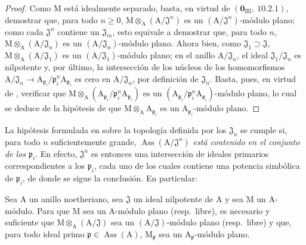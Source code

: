 \begin{proof}
Como $\mathrm{M}$ está idealmente separado, basta, en virtud de $(\mathbf{0}_{\mathrm{III}},~10.2.1)$, demostrar
que, para todo $n\geq 0$, $\mathrm{M}\otimes_\mathrm{A}(\mathrm{A}/\mathfrak{J}^n)$ es un $(\mathrm{A}/\mathfrak{J}^n)$-módulo plano; como cada $\mathfrak{J}^n$ contiene
un $\mathfrak{J}_m$, esto equivale a demostrar que, para todo $n$, $\mathrm{M}\otimes_\mathrm{A}(\mathrm{A}/\mathfrak{J}_n)$ es un $(\mathrm{A}/\mathfrak{J}_n)$-módulo
plano. Ahora bien, como $\mathfrak{J}_1\supset\mathfrak{J}$, $\mathrm{M}\otimes_\mathrm{A}(\mathrm{A}/\mathfrak{J}_1)$ es un $(\mathrm{A}/\mathfrak{J}_1)$-módulo plano; en el anillo $\mathrm{A}/\mathfrak{J}_n$,
el ideal $\mathfrak{J}_1/\mathfrak{J}_n$ es nilpotente y, por último, la intersección de los núcleos de los homomorfismos
$\mathrm{A}/\mathfrak{J}_n\to\mathrm{A}_{\mathfrak{p}_i}/\mathfrak{p}_i^n\mathrm{A}_{\mathfrak{p}_i}$ es cero en $\mathrm{A}/\mathfrak{J}_n$, por definición de $\mathfrak{J}_n$. Basta, pues, en virtud de ,
verificar que $\mathrm{M}\otimes_\mathrm{A}(\mathrm{A}_{\mathfrak{p}_i}/\mathfrak{p}_i^n\mathrm{A}_{\mathfrak{p}_i})$ es un $(\mathrm{A}_{\mathfrak{p}_i}/\mathfrak{p}_i^n\mathrm{A}_{\mathfrak{p}_i})$-módulo plano, lo cual se deduce de
la hipótesis de que $\mathrm{M}\otimes_\mathrm{A}\mathrm{A}_{\mathfrak{p}_i}$ es un $\mathrm{A}_{\mathfrak{p}_i}$-módulo plano.
\end{proof}

\begin{remark}[11.4.8]
\label{IV.11.4.8}
La hipótesis formulada en  sobre la topología definida
por los $\mathfrak{J}_n$ se cumple si, para todo $n$ suficientemente grande, $\operatorname{Ass}(\mathrm{A}/\mathfrak{J}^n)$ \emph{está contenido en el conjunto
de los $\mathfrak{p}_i$}. En efecto, $\mathfrak{J}^n$ es entonces una intersección de ideales primarios correspondientes a los $\mathfrak{p}_i$, cada uno de los cuales
contiene una potencia simbólica de $\mathfrak{p}_i$, de donde se sigue la conclusión. En particular:
\end{remark}

\begin{corollary}[11.4.9]
\label{IV.11.4.9}
Sea $\mathrm{A}$ un anillo noetheriano, sea $\mathfrak{J}$ un ideal nilpotente de $\mathrm{A}$ y sea $\mathrm{M}$ un
$\mathrm{A}$-módulo. Para que $\mathrm{M}$ sea un $\mathrm{A}$-módulo plano (resp.\ libre), es necesario y suficiente que $\mathrm{M}\otimes_\mathrm{A}(\mathrm{A}/\mathfrak{J})$
sea un $(\mathrm{A}/\mathfrak{J})$-módulo plano (resp.\ libre) y que, para todo ideal primo $\mathfrak{p}\in\operatorname{Ass}(\mathrm{A})$, $\mathrm{M}_\mathfrak{p}$ sea un
$\mathrm{A}_\mathfrak{p}$-módulo plano.
\end{corollary}

